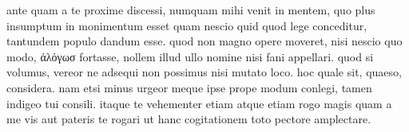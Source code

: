 


 ante quam a te proxime discessi, numquam mihi venit in mentem, quo plus insumptum in monimentum esset quam nescio quid quod lege conceditur, tantundem populo dandum esse. quod non magno opere moveret, nisi nescio quo modo, ἀλόγωσ fortasse, nollem illud ullo nomine nisi fani appellari. quod si volumus, vereor ne adsequi non possimus nisi mutato loco. hoc quale sit, quaeso, considera. nam etsi minus urgeor meque ipse prope modum conlegi, tamen indigeo tui consili. itaque te vehementer etiam atque etiam rogo magis quam a me vis aut pateris te rogari ut hanc cogitationem toto pectore amplectare.
